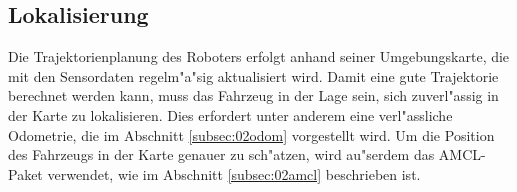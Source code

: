 \subsection{Lokalisierung}
\label{subsec:02lokalisierung}

Die Trajektorienplanung des Roboters erfolgt anhand seiner Umgebungskarte, die mit den Sensordaten regelm"a"sig aktualisiert wird. Damit eine gute Trajektorie berechnet werden kann, muss das Fahrzeug in der Lage sein, sich zuverl"assig in der Karte zu lokalisieren. Dies erfordert unter anderem eine verl"assliche Odometrie, die im Abschnitt \ref{subsec:02odom} vorgestellt wird. Um die Position des Fahrzeugs in der Karte genauer zu sch"atzen, wird au"serdem das AMCL-Paket verwendet, wie im Abschnitt \ref{subsec:02amcl} beschrieben ist.



